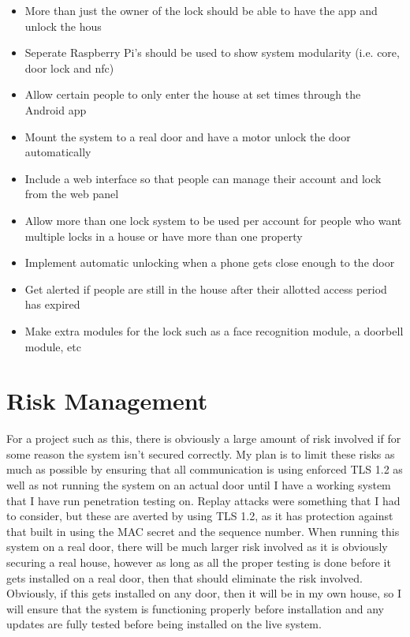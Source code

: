 \begin{itemize}
	\item More than just the owner of the lock should be able to have the app and unlock the hous
	\item Seperate Raspberry Pi's should be used to show system modularity (i.e. core, door lock and nfc)
	\item Allow certain people to only enter the house at set times through the Android app
	\item Mount the system to a real door and have a motor unlock the door automatically
	\item Include a web interface so that people can manage their account and lock from the web panel
	\item Allow more than one lock system to be used per account for people who want multiple locks in a house or have more than one property
	\item Implement automatic unlocking when a phone gets close enough to the door
	\item Get alerted if people are still in the house after their allotted access period has expired
	\item Make extra modules for the lock such as a face recognition module, a doorbell module, etc
\end{itemize}


\section{Risk Management}
For a project such as this, there is obviously a large amount of risk involved if for some reason the system isn't secured correctly. My plan is to limit these risks as much as possible by ensuring that all communication is using enforced TLS 1.2 as well as not running the system on an actual door until I have a working system that I have run penetration testing on. Replay attacks were something that I had to consider, but these are averted by using TLS 1.2, as it has protection against that built in using the MAC secret and the sequence number. When running this system on a real door, there will be much larger risk involved as it is obviously securing a real house, however as long as all the proper testing is done before it gets installed on a real door, then that should eliminate the risk involved. Obviously, if this gets installed on any door, then it will be in my own house, so I will ensure that the system is functioning properly before installation and any updates are fully tested before being installed on the live system.

